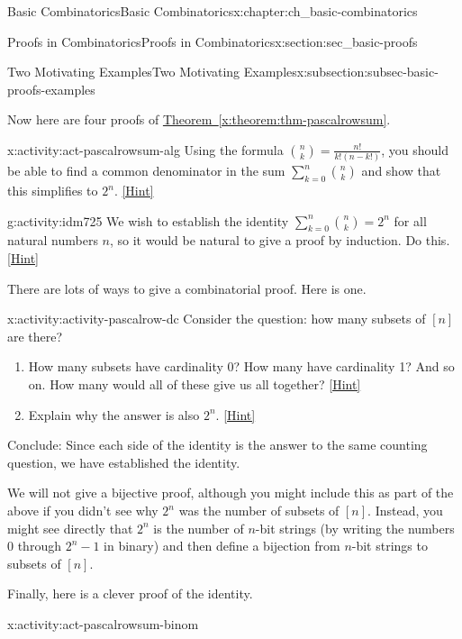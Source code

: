 \documentclass[oneside,10pt,]{book}
\numberwithin{equation}{chapter}
\begin{document}
\begin{chapterptx}{Basic Combinatorics}{}{Basic Combinatorics}{}{}{x:chapter:ch_basic-combinatorics}
\begin{sectionptx}{Proofs in Combinatorics}{}{Proofs in Combinatorics}{}{}{x:section:sec_basic-proofs}
\begin{subsectionptx}{Two Motivating Examples}{}{Two Motivating Examples}{}{}{x:subsection:subsec-basic-proofs-examples}
\par
Now here are four proofs of \hyperref[x:theorem:thm-pascalrowsum]{Theorem~\ref{x:theorem:thm-pascalrowsum}}.%
\begin{activity}{}{x:activity:act-pascalrowsum-alg}%
Using the formula \(\binom{n}{k} = \frac{n!}{k!(n-k!)}\), you should be able to find a common denominator in the sum \(\sum_{k=0}^n \binom{n}{k}\) and show that this simplifies to \(2^n\).%
\space\hspace*{0pt}\hfill{\tiny\hyperlink{g:hint:idm722-back}{[Hint]}}\end{activity}
\begin{activity}{}{g:activity:idm725}%
We wish to establish the identity \(\sum_{k=0}^n \binom{n}{k} = 2^n\) for all natural numbers \(n\), so it would be natural to give a proof by induction.  Do this.%
\space\hspace*{0pt}\hfill{\tiny\hyperlink{g:hint:idm730-back}{[Hint]}}\end{activity}
There are lots of ways to give a combinatorial proof.  Here is one.%
\begin{activity}{}{x:activity:activity-pascalrow-dc}%
Consider the question: how many subsets of \([n]\) are there?%
\begin{enumerate}[font=\bfseries,label=(\alph*),ref=\alph*]
\item{}How many subsets have cardinality 0?  How many have cardinality 1?  And so on.  How many would all of these give us all together?%
\space\hspace*{0pt}\hfill{\tiny\hyperlink{g:hint:idm759-back}{[Hint]}}\item{}Explain why the answer is also \(2^n\).%
\space\hspace*{0pt}\hfill{\tiny\hyperlink{g:hint:idm772-back}{[Hint]}}\end{enumerate}
Conclude: Since each side of the identity is the answer to the same counting question, we have established the identity.%
\end{activity}
We will not give a bijective proof, although you might include this as part of the above if you didn't see why \(2^n\) was the number of subsets of \([n]\).  Instead, you might see directly that \(2^n\) is the number of \(n\)-bit strings (by writing the numbers 0 through \(2^n - 1\) in binary) and then define a bijection from \(n\)-bit strings to subsets of \([n]\).%
\par
Finally, here is a clever proof of the identity.%
\begin{activity}{}{x:activity:act-pascalrowsum-binom}%

\end{activity}
\end{subsectionptx}
\end{sectionptx}
\end{chapterptx}
\end{document}
